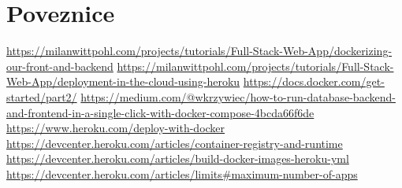 \section{Poveznice}
\url{https://milanwittpohl.com/projects/tutorials/Full-Stack-Web-App/dockerizing-our-front-and-backend} \newline
\url{https://milanwittpohl.com/projects/tutorials/Full-Stack-Web-App/deployment-in-the-cloud-using-heroku} \newline
\url{https://docs.docker.com/get-started/part2/} \newline
\url{https://medium.com/@wkrzywiec/how-to-run-database-backend-and-frontend-in-a-single-click-with-docker-compose-4bcda66f6de} \newline
\url{https://www.heroku.com/deploy-with-docker} \newline
\url{https://devcenter.heroku.com/articles/container-registry-and-runtime} \newline
\url{https://devcenter.heroku.com/articles/build-docker-images-heroku-yml}\newline
\url{https://devcenter.heroku.com/articles/limits#maximum-number-of-apps}\newline

	 
